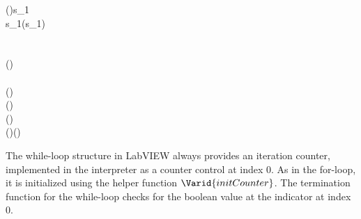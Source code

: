 \begin{hscode}\SaveRestoreHook
{}%
%
%
%
%
%
%
%
\>[B]{}\;(\;\;)\;s_{1}\;\;\mathrel{=}{}\<[E]%
\\
\>[B]{}\<[4]%
\>[4]{}\;\;\;s_{1}\;\;(\;s_{1}\;\;){}\<[E]%
\\
\>[B]{}\<[4]%
\>[4]{}\<[E]%
\\
\>[4]{}\<[7]%
\>[7]{}\;\mathrel{=}{}\<[E]%
\\
\>[7]{}\<[10]%
\>[10]{}(\mathbin{+}\geq {}){}\<[E]%
\\
\>[7]{}\<[10]%
\>[10]{}\<[E]%
\\
\>[10]{}\<[13]%
\>[13]{}\;\<[22]%
\>[22]{}\mathrel{=}\;(\;)\;\<[E]%
\\
\>[10]{}\<[13]%
\>[13]{}\;\<[22]%
\>[22]{}\mathrel{=}\mathbin{\$}\;(\;)\;\<[E]%
\\
\>[4]{}\<[7]%
\>[7]{}\;(\;\anonymous ){}\<[32]%
\>[32]{}\mathrel{=}\<[E]%
\\
\>[4]{}\<[7]%
\>[7]{}\;(\;){}\<[32]%
\>[32]{}\mathrel{=}\;(\;){}\<[E]%
\ColumnHook
\end{hscode}\resethooks

The while-loop structure in LabVIEW always provides an iteration counter,
implemented in the interpreter as a counter control at index 0. As in the
for-loop, it is initialized using the helper function \ensuremath{\Varid{initCounter}}. The
termination function for the while-loop checks for the boolean value at the
indicator at index 0.

